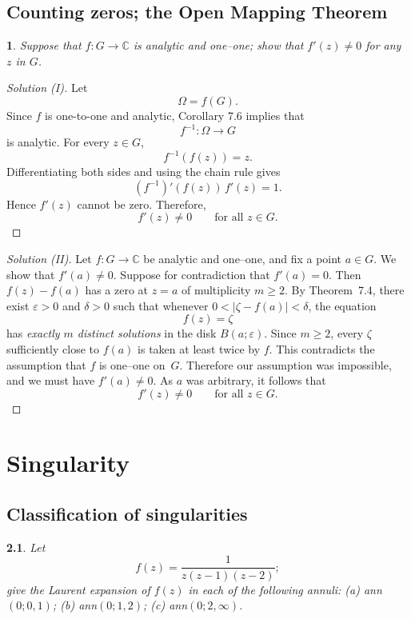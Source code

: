 \documentclass[12pt, a4paper]{report}
\theoremstyle{spaced}
\newtheorem{exercise}{}
\newcommand{\setexercise}[1]{\setcounter{exercise}{#1-1}}
\begin{document}
\section{Counting zeros; the Open Mapping Theorem}
\setexercise{4}
\begin{exercise}
	Suppose that $f : G \to \mathbb{C}$ is analytic and one--one; show that $f'(z) \neq 0$ for any $z$ in $G$.
\end{exercise}
\begin{proof}[Solution (I)]
	Let
	\[
		\Omega=f(G).
	\]
	Since $f$ is one-to-one and analytic, Corollary 7.6 implies that
	\[
		f^{-1}:\Omega\to G
	\]
	is analytic.
	For every $z\in G$,
	\[
		f^{-1}(f(z))=z.
	\]
	Differentiating both sides and using the chain rule gives
	\[
		(f^{-1})'(f(z))\,f'(z)=1.
	\]
	Hence $f'(z)$ cannot be zero. Therefore,
	\[
		f'(z)\neq 0 \qquad \text{for all } z\in G.
	\]
\end{proof}

\begin{proof}[Solution (II)]
	Let $f : G \to \mathbb{C}$ be analytic and one--one, and fix a point
	$a \in G$.  We show that $f'(a) \neq 0$.
	Suppose for contradiction that $f'(a)=0$.
	Then $f(z)-f(a)$ has a zero at $z=a$ of multiplicity $m \ge 2$.
	By Theorem~7.4, there exist $\varepsilon>0$ and $\delta>0$ such that
	whenever $0<|\zeta - f(a)| < \delta$, the equation
	\[
		f(z)=\zeta
	\]
	has \emph{exactly $m$ distinct solutions} in the disk $B(a;\varepsilon)$.
	Since $m\ge 2$, every $\zeta$ sufficiently close to $f(a)$ is taken at
	least twice by $f$.
	This contradicts the assumption that $f$ is one--one on~$G$.
	Therefore our assumption was impossible, and we must have $f'(a) \neq 0$.
	As $a$ was arbitrary, it follows that
	\[
		f'(z) \neq 0 \qquad \text{for all } z \in G.
	\]
\end{proof}

\chapter{Singularity}
\section{Classification of singularities}
\setexercise{4}
\begin{exercise}
	Let
	\[
		f(z)=\frac{1}{z(z-1)(z-2)};
	\]
	give the Laurent expansion of \(f(z)\) in each of the following annuli:
	(a) ann\((0;0,1)\);
	(b) ann\((0;1,2)\);
	(c) ann\((0;2,\infty)\).
\end{exercise}
\end{document}
